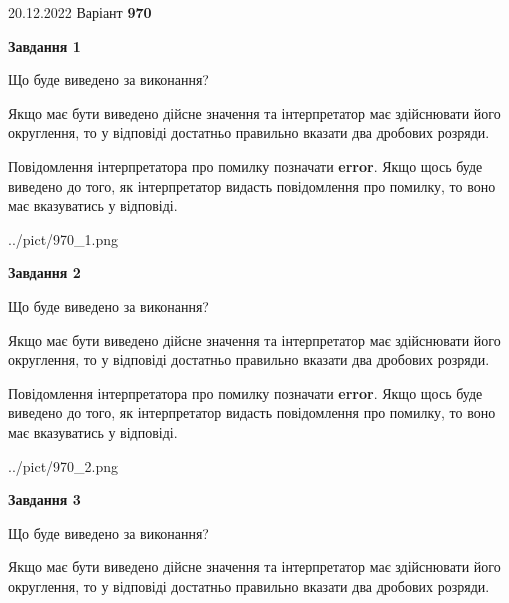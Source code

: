 \documentclass[12pt, ukrainian]{article}
\begin{document}
{20.12.2022 Варіант \No \textbf { 970 }\par}
{
\begin {Large}

{\begin {center}\textbf{Завдання 1}\end {center}}\par
Що буде виведено за виконання? \par

Якщо має бути виведено дійсне значення та інтерпретатор має здійснювати його округлення, 
то у відповіді достатньо правильно вказати два дробових розряди.

Повідомлення інтерпретатора про помилку позначати \textbf{error}.
Якщо щось буде виведено до того, як інтерпретатор видасть повідомлення про помилку, 
то воно має вказуватись у відповіді. \par

\begin{center}
	{../pict/970_1.png}
\end{center}
\newpage

{\begin {center}\textbf{Завдання 2}\end {center}}\par
Що буде виведено за виконання? \par

Якщо має бути виведено дійсне значення та інтерпретатор має здійснювати його округлення, 
то у відповіді достатньо правильно вказати два дробових розряди.

Повідомлення інтерпретатора про помилку позначати \textbf{error}.
Якщо щось буде виведено до того, як інтерпретатор видасть повідомлення про помилку, 
то воно має вказуватись у відповіді. \par

\begin{center}
	{../pict/970_2.png}
\end{center}
\newpage

{\begin {center}\textbf{Завдання 3}\end {center}}\par
Що буде виведено за виконання? \par

Якщо має бути виведено дійсне значення та інтерпретатор має здійснювати його округлення, 
то у відповіді достатньо правильно вказати два дробових розряди.


\end{Large}}
\end{document}
